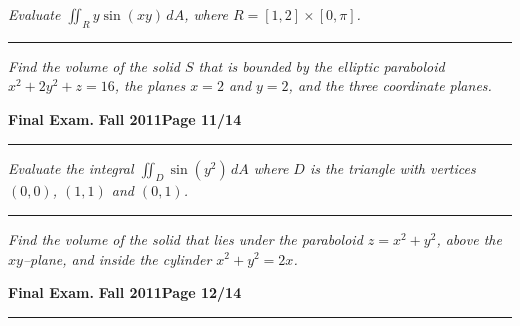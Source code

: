 \documentclass[12pt]{article}
\begin{document}
\bigskip
{\problem[15 pts] \em  Evaluate $\iint_R y \sin(xy)\, dA$, where
  $R=[1,2] \times [0,\pi]$.}
\vspace{8cm}
\begin{flushright}
\end{flushright}
\hrule
{\problem[15 pts] \em Find the volume of the solid $S$ that is bounded
  by the elliptic paraboloid $x^2+2y^2+z=16$, the planes $x=2$ and
  $y=2$, and the three coordinate planes.}
\vspace{9cm}
\begin{flushright}
\end{flushright}
\newpage

\hfill{\large\bf Final Exam.}\hfill{\large\bf
  Fall 2011}\hfill{\large\bf Page 11/14}\hrule

\bigskip
{\problem[15 pts] \em Evaluate the integral $\iint_D \sin(y^2)\, dA$
  where $D$ is the triangle with vertices $(0,0)$, $(1,1)$ and
  $(0,1)$.}
\vspace{8cm}
\begin{flushright}
\end{flushright}
\hrule
{\problem[10 pts] \em Find the volume of the solid that lies under the
  paraboloid $z=x^2+y^2$, above the $xy$--plane, and inside the
  cylinder $x^2+y^2=2x$.}
\vspace{8cm}
\begin{flushright}
\end{flushright}
\newpage

\hfill{\large\bf Final Exam.}\hfill{\large\bf
  Fall 2011}\hfill{\large\bf Page 12/14}\hrule
\end{document}
